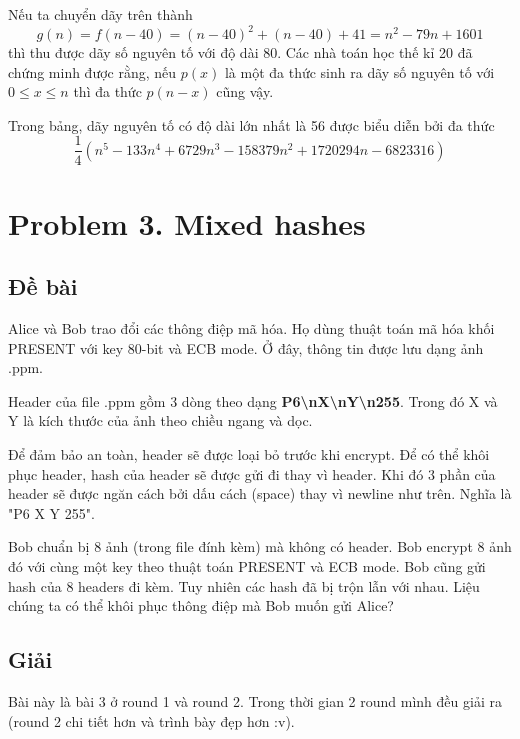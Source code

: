 Nếu ta chuyển dãy trên thành
\begin{equation*}
    g(n) = f(n-40) = (n-40)^2 + (n-40) + 41 = n^2 - 79 n + 1601
\end{equation*}
thì thu được dãy số nguyên tố với độ dài 80. Các nhà toán học thế kỉ 20 đã chứng minh được rằng, nếu $p(x)$ là một đa thức sinh ra dãy số nguyên tố với $0 \leqslant x \leqslant n$ thì đa thức $p(n-x)$ cũng vậy.

Trong bảng, dãy nguyên tố có độ dài lớn nhất là 56 được biểu diễn bởi đa thức
\begin{equation*}
    \frac{1}{4} \left( n^5 - 133 n^4 + 6729 n^3 - 158379 n^2 + 1720294 n - 6823316 \right)
\end{equation*}

\section*{Problem 3. Mixed hashes}

\subsection*{Đề bài}

Alice và Bob trao đổi các thông điệp mã hóa. Họ dùng thuật toán mã hóa khối PRESENT với key 80-bit và ECB mode. Ở đây, thông tin được lưu dạng ảnh .ppm.

Header của file .ppm gồm 3 dòng theo dạng \textbf{P6\textbackslash nX\textbackslash nY\textbackslash n255}. Trong đó X và Y là kích thước của ảnh theo chiều ngang và dọc.

Để đảm bảo an toàn, header sẽ được loại bỏ trước khi encrypt. Để có thể khôi phục header, hash của header sẽ được gửi đi thay vì header. Khi đó 3 phần của header sẽ được ngăn cách bởi dấu cách (space) thay vì newline như trên. Nghĩa là "P6 X Y 255".

Bob chuẩn bị 8 ảnh (trong file đính kèm) mà không có header. Bob encrypt 8 ảnh đó với cùng một key theo thuật toán PRESENT và ECB mode. Bob cũng gửi hash của 8 headers đi kèm. Tuy nhiên các hash đã bị trộn lẫn với nhau. Liệu chúng ta có thể khôi phục thông điệp mà Bob muốn gửi Alice?

\subsection*{Giải}

Bài này là bài 3 ở round 1 và round 2. Trong thời gian 2 round mình đều giải ra (round 2 chi tiết hơn và trình bày đẹp hơn :v).

